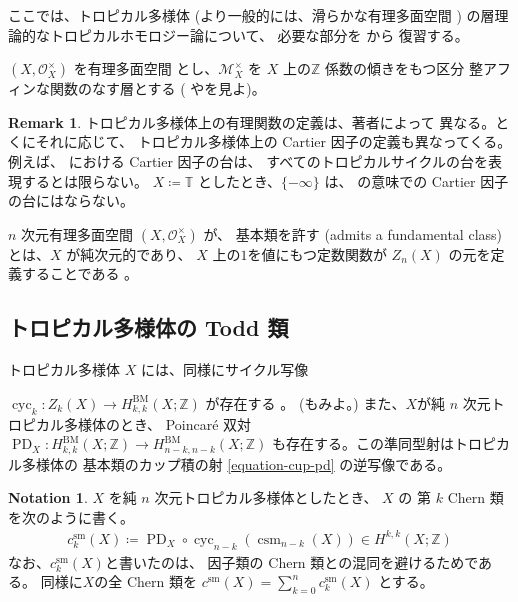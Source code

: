 \documentclass[a4paper,dvipdfmx,reqno,12pt]{amsart}
\theoremstyle{definition}
\newtheorem{notation}[theorem]{Notation}
\newtheorem{remark}[theorem]{Remark}
\newcommand{\deq}{\coloneqq}
\newcommand{\opn}[1]{\operatorname{#1}}
\numberwithin{equation}{section}
\begin{document}
ここでは、トロピカル多様体 
(より一般的には、滑らかな有理多面空間
\cite[Definition 6.1]{MR4637248})
の層理論的なトロピカルホモロジー論について、
必要な部分を \cite{MR4637248} から
復習する。

$(X,\mathcal{O}_X^{\times})$ を有理多面空間
とし、$\mathcal{M}_X^{\times}$ を
$X$ 上の$\mathbb{Z}$ 係数の傾きをもつ区分
整アフィンな関数のなす層とする
(\cite[Definition 4.1]{MR3894860}
や\cite[Definition 3.8 and Remark
3.9]{MR4246795}を見よ)。

\begin{remark}
トロピカル多様体上の有理関数の定義は、著者によって
異なる。とくにそれに応じて、
トロピカル多様体上の Cartier 因子の定義も異なってくる。
例えば、\cite{MR3894860,MR4637248}
における Cartier 因子の台は、
すべてのトロピカルサイクルの台を表現するとは限らない。
$X\deq \mathbb{T}$ としたとき、$\{-\infty\}$
は、\cite{MR3894860,MR4637248} の意味での
Cartier 因子の台にはならない。
\end{remark}


$n$ 次元有理多面空間
$(X,\mathcal{O}_X^{\times})$ が、
基本類を許す
(admits a fundamental class)
とは、$X$ が純次元的であり、
$X$ 上の$1$を値にもつ定数関数が
$Z_n(X)$ の元を定義することである
\cite[]{MR4246795}。


\subsection{トロピカル多様体の Todd 類}

トロピカル多様体 $X$ には、同様にサイクル写像

$\opn{cyc}_k\colon Z_k(X)\to H^{\mathrm{BM}}_{k,k}(X;\mathbb{Z})$
が存在する
\cite{gross2019sheaftheoretic}。
(\cite[Definition 4.13]{MR3894860}もみよ。)
また、$X$が純 $n$ 次元トロピカル多様体のとき、
Poincar\'e 双対
$\opn{PD}_X\colon H_{k,k}^{\opn{BM}}(X;\mathbb{Z})
\to H_{n-k,n-k}^{\opn{BM}}(X;\mathbb{Z})$
も存在する。この準同型射はトロピカル多様体の
基本類のカップ積の射 \eqref{equation-cup-pd}
の逆写像である。

\begin{notation}
$X$ を純 $n$ 次元トロピカル多様体としたとき、
$X$ の 第 $k$ Chern 類を次のように書く。 
\begin{align}
c_{k}^{\mathrm{sm}}(X)\deq
\opn{PD}_X\circ \opn{cyc}_{n-k}(\opn{csm}_{n-k}(X))
\in H^{k,k}(X;\mathbb{Z})
\end{align}
なお、$c_{k}^{\mathrm{sm}}(X)$と書いたのは、
因子類の Chern 類との混同を避けるためである。
同様に$X$の全 Chern 類を
$c^{\mathrm{sm}}(X)=\sum_{k=0}^{n} c_{k}^{\mathrm{sm}}(X)$
とする。
\end{notation}
\end{document}
